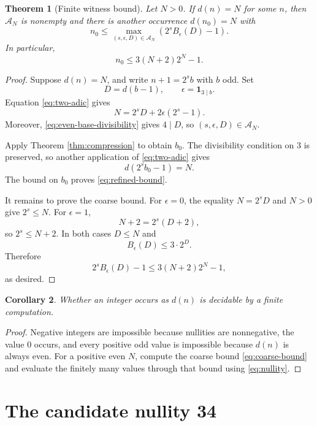\documentclass[a4paper]{article}
\newtheorem{theorem}{Theorem}[section]
\newtheorem{corollary}[theorem]{Corollary}
\begin{document}
\begin{theorem}[Finite witness bound]\label{thm:finite-witness}
	Let $N>0$.
	If $d(n)=N$ for some $n$, then $\mathcal{A}_N$ is nonempty and
	there is another occurrence $d(n_0)=N$ with
	\begin{equation}\label{eq:refined-bound}
		n_0
		\leq
		\max_{(s,\epsilon,D)\in\mathcal{A}_N}
		\left(2^sB_\epsilon(D)-1\right).
	\end{equation}
	In particular,
	\begin{equation}\label{eq:coarse-bound}
		n_0\leq3(N+2)2^N-1.
	\end{equation}
\end{theorem}

\begin{proof}
	Suppose $d(n)=N$, and write $n+1=2^s b$ with $b$ odd.
	Set
	\[
		D=d(b-1),
		\qquad
		\epsilon=\mathbf{1}_{3\mid b}.
	\]
	Equation \eqref{eq:two-adic} gives
	\[
		N=2^sD+2\epsilon(2^s-1).
	\]
	Moreover, \eqref{eq:even-base-divisibility} gives $4\mid D$, so
	$(s,\epsilon,D)\in\mathcal{A}_N$.

	Apply Theorem \ref{thm:compression} to obtain $b_0$.
	The divisibility condition on 3 is preserved, so another application
	of \eqref{eq:two-adic} gives
	\[
		d(2^s b_0-1)=N.
	\]
	The bound on $b_0$ proves \eqref{eq:refined-bound}.

	It remains to prove the coarse bound.
	For $\epsilon=0$, the equality $N=2^sD$ and $N>0$ give
	$2^s\leq N$.
	For $\epsilon=1$,
	\[
		N+2=2^s(D+2),
	\]
	so $2^s\leq N+2$.
	In both cases $D\leq N$ and
	\[
		B_\epsilon(D)\leq3\cdot2^D.
	\]
	Therefore
	\[
		2^sB_\epsilon(D)-1
		\leq3(N+2)2^N-1,
	\]
	as desired.
\end{proof}

\begin{corollary}\label{cor:decidable}
	Whether an integer occurs as $d(n)$ is decidable by a finite
	computation.
\end{corollary}

\begin{proof}
	Negative integers are impossible because nullities are nonnegative,
	the value 0 occurs, and every positive odd value is impossible because
	$d(n)$ is always even.
	For a positive even $N$, compute the coarse bound
	\eqref{eq:coarse-bound} and evaluate the finitely many values through
	that bound using \eqref{eq:nullity}.
\end{proof}

\section{The candidate nullity 34}
\end{document}
